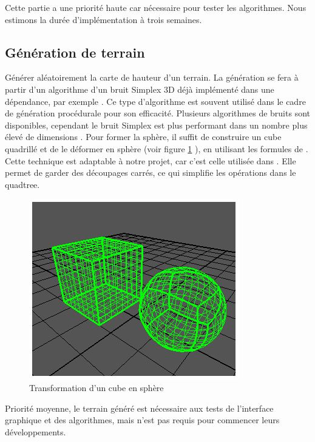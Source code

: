 \documentclass[12pt]{report}
\begin{document}
Cette partie a une priorité haute car nécessaire pour tester les
algorithmes. Nous estimons la durée d'implémentation à trois semaines.\\


\subsection{Génération de terrain}


Générer aléatoirement la carte de hauteur d'un terrain.  La génération
se fera à partir d'un algorithme d'un bruit Simplex 3D déjà implémenté
dans une dépendance, par exemple \cite{libnoise}. Ce type d'algorithme
est souvent utilisé dans le cadre de génération procédurale pour son
efficacité. Plusieurs algorithmes de bruits sont disponibles, cependant
le bruit Simplex est plus performant dans un nombre plus élevé de
dimensions \cite{Simplexnoise}.  Pour former la sphère, il suffit de
construire un cube quadrillé et de le déformer en sphère (voir figure
\ref{fig:Cubetosphere} ), en utilisant les formules de
\cite{Cube2Sphere}. Cette technique est adaptable à notre projet, car
c'est celle utilisée dans \cite{WorldGenerator}. Elle permet de garder
des découpages carrés, ce qui simplifie les opérations dans le
quadtree.\\

\begin{center}
\begin{figure}[!h]
  \includegraphics[scale=1]{img/Cubetosphere.png}
  \caption{Transformation d'un cube en sphère \cite{Cube2Sphere}}
  \label{fig:Cubetosphere}
\end{figure}
\end{center}

Priorité moyenne, le terrain généré est nécessaire aux tests de
l'interface graphique et des algorithmes, mais n'est pas requis pour
commencer leurs développements.\\
\end{document}
